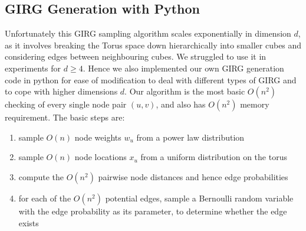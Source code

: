 \subsection{GIRG Generation with Python}
Unfortunately this GIRG sampling algorithm scales exponentially in dimension $d$, as it involves breaking the Torus space down hierarchically into smaller cubes and considering edges between neighbouring cubes. We struggled to use it in experiments for $d \geq 4$.
Hence we also implemented our own GIRG generation code in python for ease of modification to deal with different types of GIRG and to cope with higher dimensions $d$. 
Our algorithm is the most basic $O(n^2)$ checking of every single node pair $(u, v)$, and also has $O(n^2)$ memory requirement. The basic steps are:
\begin{enumerate}
    \item sample $O(n)$ node weights $w_u$ from a power law distribution
    \item sample $O(n)$ node locations $x_u$ from a uniform distribution on the torus
    \item compute the $O(n^2)$ pairwise node distances and hence edge probabilities
    \item for each of the $O(n^2)$ potential edges, sample a Bernoulli random variable with the edge probability as its parameter, to determine whether the edge exists
\end{enumerate}










